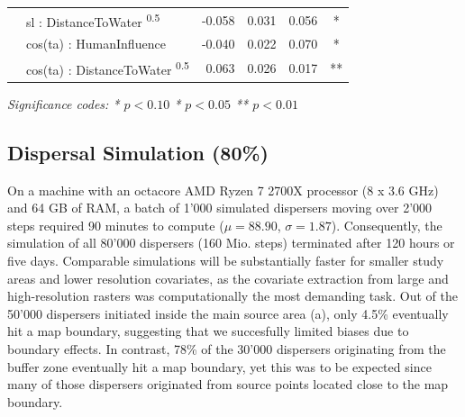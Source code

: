\documentclass[abstract=on,10pt,a4paper,bibliography=totocnumbered]{article}
\begin{document}
\begin{table}
\begin{center}
{\begin{threeparttable}
\begin{tabular}{llrrrc}
         & sl : DistanceToWater \textsuperscript{0.5} & -0.058 & 0.031 & 0.056 & * \\
         & cos(ta) : HumanInfluence & -0.040 & 0.022 & 0.070 & * \\
         & cos(ta) : DistanceToWater \textsuperscript{0.5} & 0.063 & 0.026 & 0.017 & ** \\
         \bottomrule
      \end{tabular}
       \begin{tablenotes}
         \item \textit{Significance codes: * \(p < 0.10\) \quad ** \(p < 0.05\)
         \quad *** \(p < 0.01\)}
       \end{tablenotes}
    \end{threeparttable}
    }
  \end{center}
\end{table}

\subsection{Dispersal Simulation (80\%)}
On a machine with an octacore AMD Ryzen 7 2700X processor (8 x 3.6 GHz) and 64
GB of RAM, a batch of 1'000 simulated dispersers moving over 2'000 steps
required 90 minutes to compute (\(\mu = 88.90\), \(\sigma = 1.87\)).
Consequently, the simulation of all 80'000 dispersers (160 Mio. steps)
terminated after 120 hours or five days. Comparable simulations will be
substantially faster for smaller study areas and lower resolution covariates, as
the covariate extraction from large and high-resolution rasters was
computationally the most demanding task. Out of the 50'000 dispersers initiated
inside the main source area (a), only 4.5\% eventually hit a
map boundary, suggesting that we succesfully limited biases due to boundary
effects. In contrast, 78\% of the 30'000 dispersers originating from the buffer
zone eventually hit a map boundary, yet this was to be expected since many of
those dispersers originated from source points located close to the map
boundary.
\end{document}
